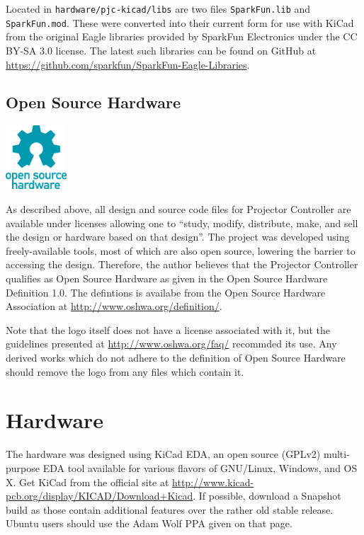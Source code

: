\documentclass{article}
\begin{document}
Located in \texttt{hardware/pjc-kicad/libs} are two files \texttt{SparkFun.lib} and
\texttt{SparkFun.mod}.  These were converted into their current form for use with KiCad from the
original Eagle libraries provided by SparkFun Electronics under the CC BY-SA 3.0 license.  The
latest such libraries can be found on GitHub at
\url{https://github.com/sparkfun/SparkFun-Eagle-Libraries}.

\subsection{Open Source Hardware} \label{ssec:OpenSourceHW}
\begin{floatingfigure}{0.22\textwidth}
    \centering
    \vspace{-6pt}
    \includegraphics[width=0.17\textwidth]{oshw-logo-200-px}
\end{floatingfigure}

As described above, all design and source code files for Projector Controller are available under
licenses allowing one to ``study, modify, distribute, make, and sell the design or hardware based on
that design''.  The project was developed using freely-available tools, most of which are also open
source, lowering the barrier to accessing the design.  Therefore, the author believes that the
Projector Controller qualifies as Open Source Hardware as given in the Open Source Hardware
Definition 1.0.  The defintions is availabe from the Open Source Hardware Association at
\url{http://www.oshwa.org/definition/}.

Note that the logo itself does not have a license associated with it, but the guidelines presented
at \url{http://www.oshwa.org/faq/} recommded its use.  Any derived works which do not adhere to the
definition of Open Source Hardware should remove the logo from any files which contain it.


\section{Hardware} \label{sec:Hardware}
The hardware was designed using KiCad EDA, an open source (GPLv2) multi-purpose EDA tool available
for various flavors of GNU/Linux, Windows, and OS X.  Get KiCad from the official site at
\url{http://www.kicad-pcb.org/display/KICAD/Download+Kicad}.  If possible, download a Snapshot build
as those contain additional features over the rather old stable release.  Ubuntu users should use
the Adam Wolf PPA given on that page.
\end{document}
